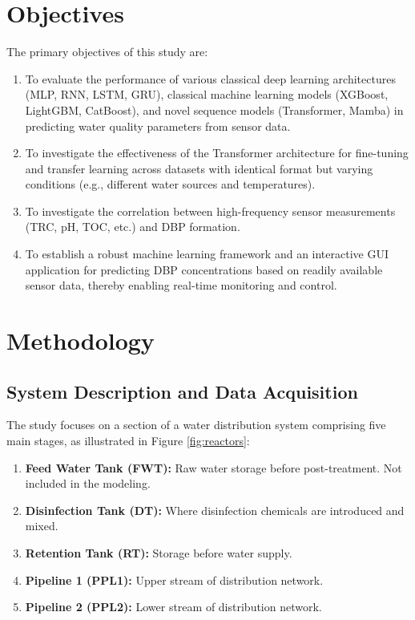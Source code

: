 \documentclass[a4paper]{article}
\begin{document}
\section{Objectives}
The primary objectives of this study are:
\begin{enumerate}
    \item To evaluate the performance of various classical deep learning architectures (MLP, RNN, LSTM, GRU), classical machine learning models (XGBoost, LightGBM, CatBoost), and novel sequence models (Transformer, Mamba) in predicting water quality parameters from sensor data.
    \item To investigate the effectiveness of the Transformer architecture for fine-tuning and transfer learning across datasets with identical format but varying conditions (e.g., different water sources and temperatures).
    \item To investigate the correlation between high-frequency sensor measurements (TRC, pH, TOC, etc.) and DBP formation.
    \item To establish a robust machine learning framework and an interactive GUI application for predicting DBP concentrations based on readily available sensor data, thereby enabling real-time monitoring and control.
\end{enumerate}

\section{Methodology}

\subsection{System Description and Data Acquisition}
The study focuses on a section of a water distribution system comprising five main stages, as illustrated in Figure \ref{fig:reactors}:
\begin{enumerate}
    \item \textbf{Feed Water Tank (FWT):} Raw water storage before post-treatment. Not included in the modeling.
    \item \textbf{Disinfection Tank (DT):} Where disinfection chemicals are introduced and mixed.
    \item \textbf{Retention Tank (RT):} Storage before water supply.
    \item \textbf{Pipeline 1 (PPL1):} Upper stream of distribution network.
    \item \textbf{Pipeline 2 (PPL2):} Lower stream of distribution network.
\end{enumerate}
\end{document}

